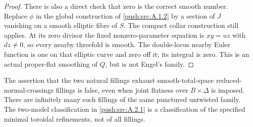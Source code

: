 \begin{proof}
There is also a direct check that zero is the correct smooth
number. Replace $\phi$ in the global construction of \ref{push:src:A.1.2}
by a section of $J$ vanishing on a smooth elliptic fibre of
$S$. The compact collar construction still applies. At its
zero divisor the fixed nonzero-parameter equation is $xy=uz$
with $dz\ne0$, so every nearby threefold is smooth. The
double-locus nearby Euler function is one on that elliptic
curve and zero off it; its integral is zero. This is an actual
proper-flat smoothing of $Q$, but is not Engel's family.
\end{proof}

\begin{proposition}\label{push:src:A.3.3}\label{push:A33}
The assertion that the two natural
fillings exhaust smooth-total-space reduced-normal-crossings
fillings is false, even when joint flatness over
$B\times\Delta$ is imposed. There are infinitely many such
fillings of the same punctured untwisted family. The
two-model classification in \ref{push:src:A.2.1} is a classification of the
specified minimal toroidal refinements, not of all fillings.
\end{proposition}

